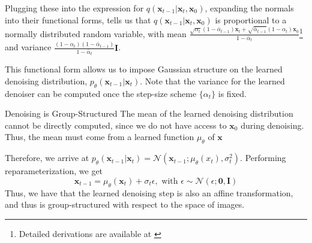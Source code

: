 \documentclass{beamer}
\begin{document}
\begin{frame}%
  Plugging these into the expression for $q(\mathbf{x}_{t-1}|\mathbf{x}_t, \mathbf{x}_0)$, expanding the normals into their functional forms, tells us that $q(\mathbf{x}_{t-1} | \mathbf{x}_t, \mathbf{x}_0)$ is proportional to a normally distributed random variable, with mean $ \frac{\sqrt{\alpha_t}(1 - \bar \alpha_{t-1})\mathbf{x}_t + \sqrt{\bar \alpha_{t-1}}(1 - \alpha_t)\mathbf{x}_0}{1 - \bar \alpha_t}$\footnote{Detailed derivations are available at \cite{luo2022understanding}} and variance $\frac{(1 - \alpha_t)(1 - \bar \alpha_{t-1})}{1 - \bar \alpha_t}\mathbf{I}$.

  This functional form allows us to impose Gaussian structure on the learned denoising distribution, $p_\theta(\mathbf{x}_{t-1}|\mathbf{x}_t)$. Note that the variance for the learned denoiser can be computed once the step-size scheme $\{\alpha_t\}$ is fixed.
\end{frame}
\begin{frame}{Denoising is Group-Structured}
The mean of the learned denoising distribution cannot be directly computed, since we do not have access to $\mathbf{x}_0$ during denoising. Thus, the mean must come from a learned function $\mu_\theta$ of $\mathbf{x}$

Therefore, we arrive at $p_\theta(\mathbf{x}_{t-1}|\mathbf{x}_{t}) = \mathcal{N}(\mathbf{x}_{t-1}; \mu_\theta(x_t), \sigma^2_t)$. Performing reparameterization, we get
\[ 
  \mathbf{x}_{t-1} = \mu_\theta(\mathbf{x}_t) + \sigma_t\epsilon
, \text{~with~} \epsilon \sim \mathcal{N}(\epsilon; \mathbf{0}, \mathbf{I})
\]
Thus, we have that the learned denoising step is also an affine transformation, and thus is group-structured with respect to the space of images.
\end{frame}
\end{document}
